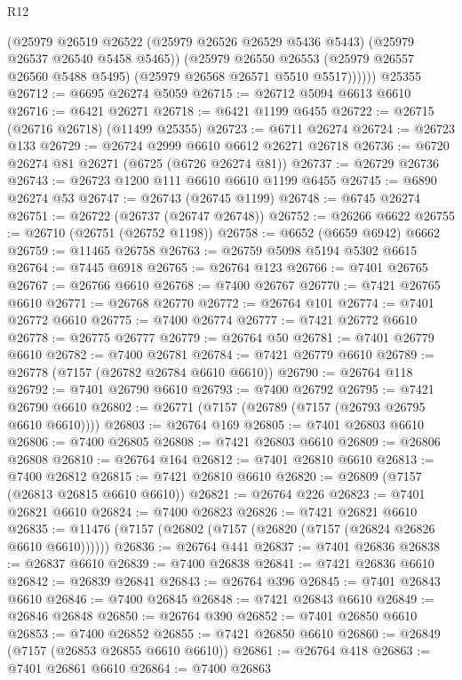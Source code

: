 \begin{lexlean}{R12}
\begin{coremodule}
{{{{{{{{{{{{{{{{{{{{{{{{{{{{{{{{{{{{{{{{{{{{{{{{{{{{{{{{{{{{{{{{{{{{{{{{{{{{{{{{{{            (@25979
              @26519
              @26522
              (@25979 @26526 @26529 @5436 @5443)
              (@25979 @26537 @26540 @5458 @5465))
            (@25979
              @26550
              @26553
              (@25979 @26557 @26560 @5488 @5495)
              (@25979 @26568 @26571 @5510 @5517))))))
    @25355
@26712 := @6695 @26274 @5059
@26715 := @26712 @5094 @6613 @6610
@26716 := @6421 @26271
@26718 := @6421 @1199 @6455
@26722 := @26715 (@26716 @26718) (@11499 @25355)
@26723 := @6711 @26274
@26724 := @26723 @133
@26729 := @26724 @2999 @6610 @6612 @26271 @26718
@26736 := @6720 @26274 @81 @26271 (@6725 (@6726 @26274 @81))
@26737 := @26729 @26736
@26743 := @26723 @1200 @111 @6610 @6610 @1199 @6455
@26745 := @6890 @26274 @53
@26747 := @26743 (@26745 @1199)
@26748 := @6745 @26274
@26751 := @26722 (@26737 (@26747 @26748))
@26752 := @26266 @6622
@26755 := @26710 (@26751 (@26752 @1198))
@26758 := @6652 (@6659 @6942) @6662
@26759 := @11465 @26758
@26763 := @26759 @5098 @5194 @5302 @6615
@26764 := @7445 @6918
@26765 := @26764 @123
@26766 := @7401 @26765
@26767 := @26766 @6610
@26768 := @7400 @26767
@26770 := @7421 @26765 @6610
@26771 := @26768 @26770
@26772 := @26764 @101
@26774 := @7401 @26772 @6610
@26775 := @7400 @26774
@26777 := @7421 @26772 @6610
@26778 := @26775 @26777
@26779 := @26764 @50
@26781 := @7401 @26779 @6610
@26782 := @7400 @26781
@26784 := @7421 @26779 @6610
@26789 := @26778 (@7157 (@26782 @26784 @6610 @6610))
@26790 := @26764 @118
@26792 := @7401 @26790 @6610
@26793 := @7400 @26792
@26795 := @7421 @26790 @6610
@26802 := @26771 (@7157 (@26789 (@7157 (@26793 @26795 @6610 @6610))))
@26803 := @26764 @169
@26805 := @7401 @26803 @6610
@26806 := @7400 @26805
@26808 := @7421 @26803 @6610
@26809 := @26806 @26808
@26810 := @26764 @164
@26812 := @7401 @26810 @6610
@26813 := @7400 @26812
@26815 := @7421 @26810 @6610
@26820 := @26809 (@7157 (@26813 @26815 @6610 @6610))
@26821 := @26764 @226
@26823 := @7401 @26821 @6610
@26824 := @7400 @26823
@26826 := @7421 @26821 @6610
@26835 := @11476 (@7157 (@26802 (@7157 (@26820 (@7157 (@26824 @26826 @6610 @6610))))))
@26836 := @26764 @441
@26837 := @7401 @26836
@26838 := @26837 @6610
@26839 := @7400 @26838
@26841 := @7421 @26836 @6610
@26842 := @26839 @26841
@26843 := @26764 @396
@26845 := @7401 @26843 @6610
@26846 := @7400 @26845
@26848 := @7421 @26843 @6610
@26849 := @26846 @26848
@26850 := @26764 @390
@26852 := @7401 @26850 @6610
@26853 := @7400 @26852
@26855 := @7421 @26850 @6610
@26860 := @26849 (@7157 (@26853 @26855 @6610 @6610))
@26861 := @26764 @418
@26863 := @7401 @26861 @6610
@26864 := @7400 @26863
}}}}}}}}}}}}}}}}}}}}}}}}}}}}}}}}}}}}}}}}}}}}}}}}}}}}}}}}}}}}}}}}}}}}}}}}}}}}}}}}}}
\end{coremodule}
\end{lexlean}
